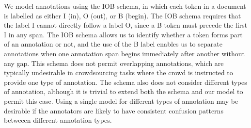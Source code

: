 %

We model annotations using the IOB schema, in which each token in a document is labelled as either I (in), O (out), or B (begin). The IOB schema requires that the label I cannot directly follow a label O, since a B token must precede the first I in any span. The IOB schema allows us to identify whether a token forms part of an annotation or not, and the use of the B label enables us to separate annotations when one annotation span begins immediately after another without any gap. This schema does not permit overlapping annotations, which are typically undesirable in crowdsourcing tasks where the crowd is instructed to provide one type of annotation. The schema also does not consider different types of annotation, although it is trivial to extend both the schema and our model to permit this case. Using a single model for different types of annotation may be desirable if the annotators are likely to have consistent confusion patterns betweeen different annotation types. 

